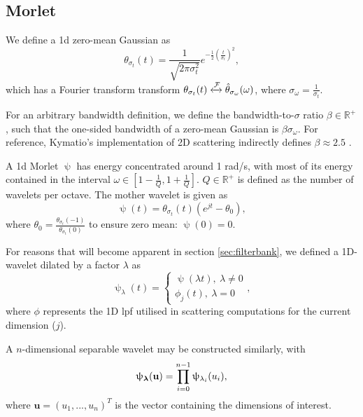 \subsection{Morlet}

We define a \ac{1d} zero-mean Gaussian as
\begin{equation}
    \theta_{\sigma_t}(t) = \frac{1}{\sqrt{2\pi\sigma_t^2}}e^{-\frac{1}{2}\left(\frac{t}{\sigma_t}\right)^2},
\end{equation}
which has a Fourier transform transform $\theta_{\sigma_t}(t) \xleftrightarrow{\mathcal{F}} \hat{\theta}_{\sigma_\omega}(\omega)$, where $\sigma_\omega = \frac{1}{\sigma_t}$.

For an arbitrary bandwidth definition, we define the bandwidth-to-$\sigma$ ratio $\beta \in \mathbb{R}^+$, such that the one-sided bandwidth of a zero-mean Gaussian is $\beta \sigma_\omega$. For reference, Kymatio's implementation of 2D scattering indirectly defines $\beta \approx 2.5$ \citep{kymatio}.


A \ac{1d} Morlet $\uppsi$ has energy concentrated around 1 rad/s, with most of its energy contained in the interval $\omega \in [1 - \frac{1}{Q}, 1 + \frac{1}{Q}]$. $Q \in \mathbb{R}^+$ is defined as the number of wavelets per octave. The mother wavelet is given as
\begin{equation}
    \uppsi(t) = \theta_{\sigma_t}(t)\left(e^{jt} - \theta_0 \right),
\end{equation}
where $\theta_0 = \frac{\theta_{\sigma_t}(-1)}{\theta_{\sigma_t}(0)}$ to ensure zero mean: $\hat{\uppsi}(0) = 0$.

For reasons that will become apparent in section \ref{sec:filterbank}, we defined a 1D-wavelet dilated by a factor $\lambda$ as 
\begin{equation}
\label{eqn:dilwav}
    \uppsi_\lambda(t) = \begin{cases}
        \uppsi(\lambda t), \ \lambda \neq 0 \\
        \phi_j(t), \ \lambda = 0
    \end{cases},
\end{equation}
where $\phi$ represents the 1D \ac{lpf} utilised in scattering computations for the current dimension ($j$).

A $n$-dimensional separable wavelet may be constructed similarly, with
\begin{equation}
    \uppsi_{\boldsymbol{\mathbf{\lambda}} }(\mathbf{u}) = \prod_{i=0}^{n-1} \uppsi_{\lambda_i}(u_i),
\end{equation}
where $\mathbf{u} = \left(u_1, ..., u_n\right)^T$ is the vector containing the dimensions of interest.

